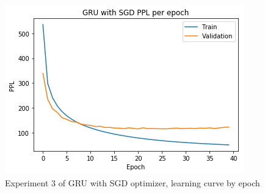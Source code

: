 \begin{itemize}
\begin{figure}[H]
	\centering
	\includegraphics[scale=0.8]{Q4-2_GRU_SGD_epoch.png}
	\caption{Experiment 3 of GRU with SGD optimizer, learning curve by epoch}
	\label{fig:fig13}
\end{figure}


\end{itemize}
